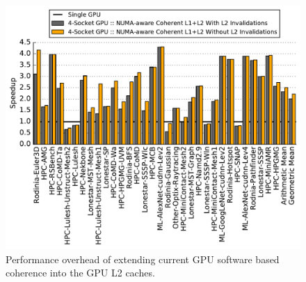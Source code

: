 \begin{figure}[t]
    \centering
    \includegraphics[width=1.0\columnwidth]{figures/plot_no_inval_WB.pdf}
     \vspace{-0.3in}
    \caption{Performance overhead of extending current GPU software based coherence
    into the GPU L2 caches.}
    \label{fig:invalidations}
    \vspace{-.25in}
\end{figure}


